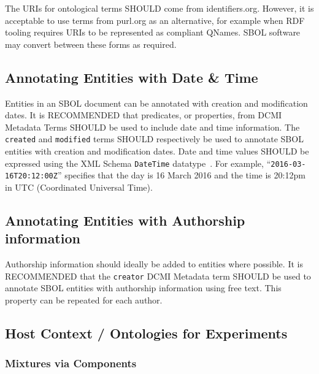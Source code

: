 The URIs for ontological terms SHOULD come from identifiers.org.  However, it is acceptable to use terms from purl.org as an alternative, for example when RDF tooling requires URIs to be represented as compliant QNames.  SBOL software may convert between these forms as required.

\subsection{Annotating Entities with Date \& Time}\label{sec:DateTime}

Entities in an SBOL document can be annotated with creation and modification dates. It is RECOMMENDED that predicates, or properties, from DCMI Metadata Terms SHOULD be used to include date and time information. The \texttt{created} and \texttt{modified} terms SHOULD respectively be used to annotate SBOL entities with creation and modification dates. Date and time values SHOULD be expressed using the XML Schema \texttt{DateTime} datatype~\citep{Biron2004}. For example, ``\texttt{2016-03-16T20:12:00Z}'' specifies that the day is 16 March 2016 and the time is 20:12pm in UTC (Coordinated Universal Time).

\subsection{Annotating Entities with Authorship information}\label{sec:Authorship}

Authorship information should ideally be added to  entities where possible. It is RECOMMENDED that the \texttt{creator} DCMI Metadata term SHOULD be used to annotate SBOL entities with authorship information using free text. This property can be repeated for each author.

\subsection{Host Context / Ontologies for Experiments}

\subsubsection{Mixtures via Components}

